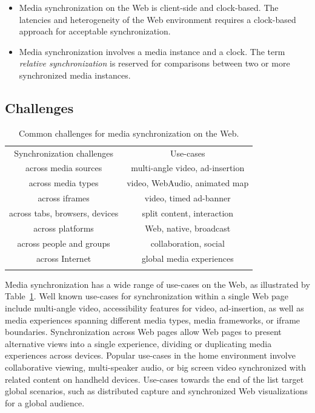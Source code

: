 \documentclass[graybox]{svmult}
\begin{document}
\begin{itemize}
\item{Media synchronization on the Web is client-side and clock-based. The latencies and heterogeneity of the Web environment requires a clock-based approach for acceptable synchronization.}
\item{Media synchronization involves a media instance and a clock. The term \emph{relative synchronization} is reserved for comparisons between two or more synchronized media instances.}
\end{itemize}

\subsection{Challenges}


\begin{table}
\centering
\caption{Common challenges for media synchronization on the Web.}
\label{tab:challenges}
\setlength{\tabcolsep}{10pt}
\begin{tabular}{cc}
\hline\noalign{\smallskip}
Synchronization challenges & Use-cases \\
\noalign{\smallskip}\svhline\noalign{\smallskip}
across media sources & multi-angle video, ad-insertion \\
across media types & video, WebAudio, animated map \\
across iframes & video, timed ad-banner \\
across tabs, browsers, devices & split content, interaction \\
across platforms & Web, native, broadcast \\
across people and groups & collaboration, social \\
across Internet & global media experiences \\
\noalign{\smallskip}\hline\noalign{\smallskip}
\end{tabular}
\end{table} 



Media synchronization has a wide range of use-cases on the Web, as illustrated
by Table~\ref{tab:challenges}. Well known use-cases for synchronization within
a single Web page include multi-angle video, accessibility features for video,
ad-insertion, as well as media experiences spanning different media types,
media frameworks, or iframe boundaries. Synchronization across Web pages allow
Web pages to present alternative views into a single experience, dividing or
duplicating media experiences across devices. Popular use-cases in the home
environment involve collaborative viewing, multi-speaker audio, or big screen
video synchronized with related content on handheld devices. Use-cases towards
the end of the list target global scenarios, such as distributed capture and
synchronized Web visualizations for a global audience.
\end{document}
